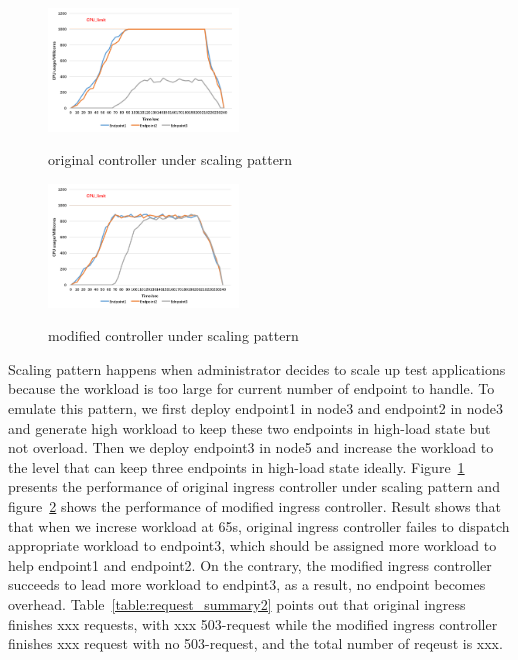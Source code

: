 \begin{figure}[!htb]
 \centering
 \includegraphics[width=0.45\textwidth]{images/data3.png}\\
 \caption{original controller under scaling pattern}
 \label{fig:original_scaling}
\end{figure}

\begin{figure}[!htb]
 \centering
 \includegraphics[width=0.45\textwidth]{images/data4.png}\\
 \caption{modified controller under scaling pattern}
 \label{fig:modified_scaling}
\end{figure}
Scaling pattern happens when administrator decides to scale up test applications because the workload is too large for current number of endpoint to handle.
To emulate this pattern, we first deploy endpoint1 in node3 and endpoint2 in node3 and generate high workload to keep these two endpoints in high-load state but not overload.
Then we deploy endpoint3 in node5 and increase the workload to the level that can keep three endpoints in high-load state ideally. Figure~{\ref{fig:original_scaling}} presents the performance of
original ingress controller under scaling pattern and figure~{\ref{fig:modified_scaling}} shows the performance of modified ingress controller. Result shows that that when we increse workload at 65s,
original ingress controller failes to dispatch appropriate workload to endpoint3, which should be assigned more workload to help endpoint1 and endpoint2. On the contrary,
the modified ingress controller succeeds to lead more workload to endpint3, as a result, no endpoint becomes overhead. Table~{\ref{table:request_summary2}} points out that original ingress finishes
xxx requests, with xxx 503-request while the modified ingress controller finishes xxx request with no 503-request, and the total number of reqeust is xxx.
